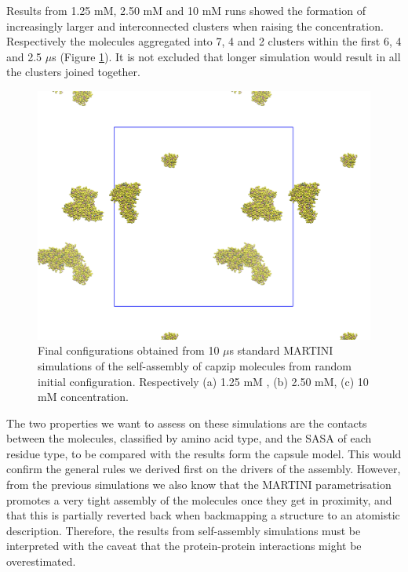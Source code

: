 Results from 1.25 mM, 2.50 mM and 10 mM runs showed the formation of increasingly larger and interconnected clusters when raising the concentration. Respectively the molecules aggregated into 7, 4 and 2 clusters within the first 6, 4 and 2.5 $\mu$s (Figure \ref{fig:SA_final}). It is not excluded that longer simulation would result in all the clusters joined together.
%
\begin{figure}[t!]
\centering\includegraphics[width=0.4\linewidth]{3results_capsule/pics/lSA120.png} 
\caption[Self-assembly simulations, final configurations]{Final configurations obtained from 10 $\mu$s standard MARTINI simulations of the self-assembly of capzip molecules from random initial configuration. Respectively (a) 1.25 mM , (b) 2.50 mM, (c) 10 mM concentration.}
\label{fig:SA_final}
\end{figure}

The two properties we want to assess on these simulations are the contacts between the molecules, classified by amino acid type, and the SASA of each residue type, to be compared with the results form the capsule model. This would confirm the general rules we derived first on the drivers of the assembly. However, from the previous simulations we also know that the MARTINI parametrisation promotes a very tight assembly of the molecules once they get in proximity, and that this is partially reverted back when backmapping a structure to an atomistic description. Therefore, the results from self-assembly simulations must be interpreted with the caveat that the protein-protein interactions might be overestimated.

